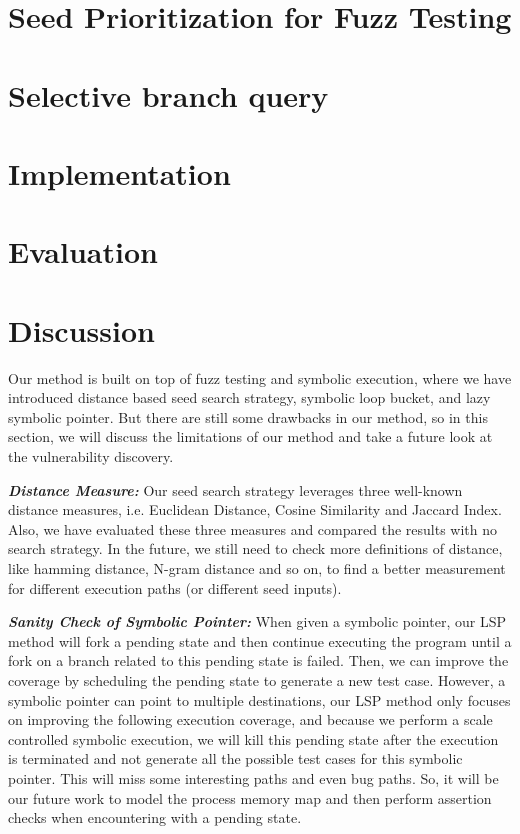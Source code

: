 \documentclass[a4paper]{article}
\begin{document}
\section{Seed Prioritization for Fuzz Testing}


\section{Selective branch query} 


\section{Implementation}



\section{Evaluation}


\section{Discussion}
Our method is built on top of fuzz testing and symbolic execution, where we have introduced distance based seed search strategy, symbolic loop bucket, and lazy symbolic pointer. But there are still some drawbacks in our method, so in this section, we will discuss the limitations of our method and take a future look at the vulnerability discovery.

\noindent\textit{\textbf{Distance Measure:}} Our seed search strategy leverages three well-known distance measures, i.e. Euclidean Distance, Cosine Similarity and Jaccard Index. Also, we have evaluated these three measures and compared the results with no search strategy. In the future, we still need to check more definitions of distance, like hamming distance, N-gram distance and so on, to find a better measurement for different execution paths (or different seed inputs). 

\noindent\textit{\textbf{Sanity Check of Symbolic Pointer:}} When given a symbolic pointer, our LSP method will fork a pending state and then continue executing the program until a fork on a branch related to this pending state is failed. Then, we can improve the coverage by scheduling the pending state to generate a new test case. However, a symbolic pointer can point to multiple destinations, our LSP method only focuses on improving the following execution coverage, and because we perform a scale controlled symbolic execution, we will kill this pending state after the execution is terminated and not generate all the possible test cases for this symbolic pointer. This will miss some interesting paths and even bug paths. So, it will be our future work to model the process memory map and then perform assertion checks when encountering with a pending state.
\end{document}
